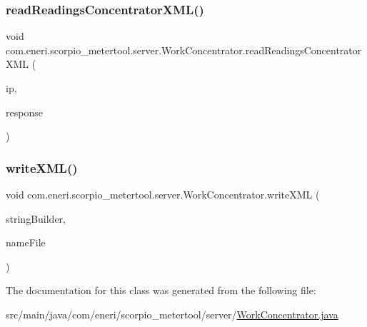 \subsubsection{\texorpdfstring{read\+Readings\+Concentrator\+X\+M\+L()}{readReadingsConcentratorXML()}}
{\footnotesize\ttfamily void com.\+eneri.\+scorpio\+\_\+metertool.\+server.\+Work\+Concentrator.\+read\+Readings\+Concentrator\+X\+ML (\begin{DoxyParamCaption}\item[{String}]{ip,  }\item[{String}]{response }\end{DoxyParamCaption})}

\mbox{\label{classcom_1_1eneri_1_1scorpio__metertool_1_1server_1_1_work_concentrator_aca5015705192a8018c29669a19bcdcef}} 
\subsubsection{\texorpdfstring{write\+X\+M\+L()}{writeXML()}}
{\footnotesize\ttfamily void com.\+eneri.\+scorpio\+\_\+metertool.\+server.\+Work\+Concentrator.\+write\+X\+ML (\begin{DoxyParamCaption}\item[{String\+Builder}]{string\+Builder,  }\item[{String}]{name\+File }\end{DoxyParamCaption})}



The documentation for this class was generated from the following file\+:\begin{DoxyCompactItemize}
\item 
src/main/java/com/eneri/scorpio\+\_\+metertool/server/\hyperlink{_work_concentrator_8java}{Work\+Concentrator.\+java}\end{DoxyCompactItemize}
